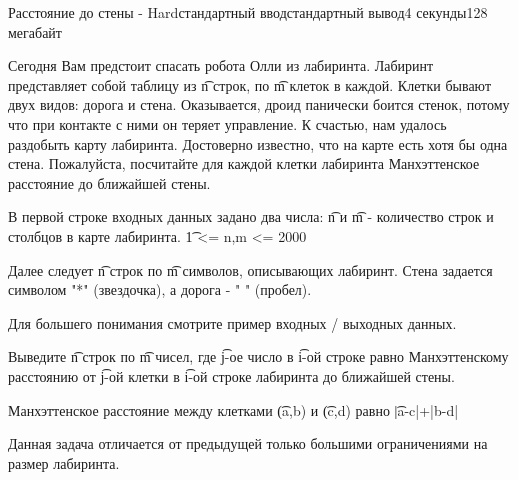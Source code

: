 \begin{problem}{Расстояние до стены - Hard}{стандартный ввод}{стандартный вывод}{4 секунды}{128 мегабайт}

Сегодня Вам предстоит спасать робота Олли из лабиринта. Лабиринт представляет собой таблицу из \t{n} строк, по \t{m} клеток в каждой. Клетки бывают двух видов: дорога и стена.
Оказывается, дроид панически боится стенок, потому что при контакте с ними он теряет управление. К счастью, нам удалось раздобыть карту лабиринта. Достоверно известно, что на карте есть хотя бы одна стена. Пожалуйста, посчитайте для каждой клетки лабиринта Манхэттенское расстояние до ближайшей стены.



\InputFile
В первой строке входных данных задано два числа: \t{n} и \t{m} - количество строк и столбцов в карте лабиринта. \t{1 <= n,m <= 2000}

Далее следует \t{n} строк по \t{m} символов, описывающих лабиринт. Стена задается символом "*" (звездочка), а дорога - " " (пробел).

Для большего понимания смотрите пример входных / выходных данных.

\OutputFile
Выведите \t{n} строк по \t{m} чисел, где \t{j}-ое число в \t{i}-ой строке равно Манхэттенскому расстоянию от \t{j}-ой клетки в \t{i}-ой строке лабиринта до ближайшей стены.

\Examples

\begin{example}
%
%
%
\end{example}

\Note
Манхэттенское расстояние между клетками \t{(a,b)} и \t{(c,d)} равно \t{|a-c|+|b-d|}

Данная задача отличается от предыдущей только большими ограничениями на размер лабиринта.

\end{problem}

